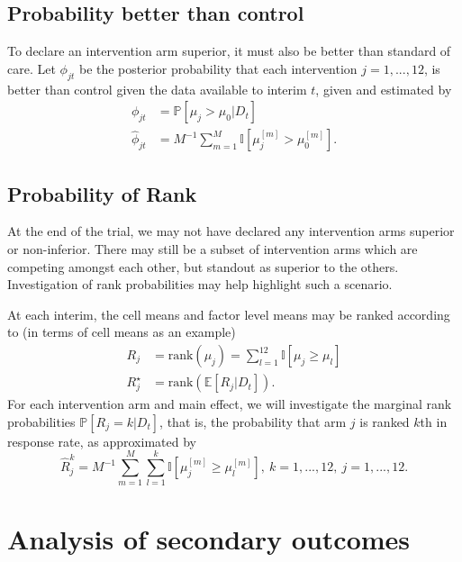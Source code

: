 \documentclass[
  bibliography=totoc]{scrreprt}
\begin{document}
\hypertarget{probability-better-than-control}{%
\subsection{Probability better than control}\label{probability-better-than-control}}

To declare an intervention arm superior, it must also be better than standard of care.
Let \(\phi_{jt}\) be the posterior probability that each intervention \(j=1,...,12\), is better than control given the data available to interim \(t\), given and estimated by
\[
\begin{aligned}
\phi_{jt} &= \mathbb P[\mu_j > \mu_0|D_t] \\
\hat\phi_{jt} &= M^{-1}\sum_{m=1}^M \mathbb I\left[\mu_{j}^{[m]}>\mu_0^{[m]}\right].
\end{aligned}
\]

\hypertarget{probability-of-rank}{%
\subsection{Probability of Rank}\label{probability-of-rank}}

At the end of the trial, we may not have declared any intervention arms superior or non-inferior.
There may still be a subset of intervention arms which are competing amongst each other, but standout as superior to the others.
Investigation of rank probabilities may help highlight such a scenario.

At each interim, the cell means and factor level means may be ranked according to (in terms of cell means as an example)
\[
\begin{aligned}
R_j &= \text{rank}(\mu_j) = \sum_{l=1}^{12} \mathbb I[\mu_j\geq\mu_l] \\
R_j^\star &=\text{rank}\left(\mathbb E[R_j|D_t]\right).
\end{aligned}
\]
For each intervention arm and main effect, we will investigate the marginal rank probabilities \(\mathbb P[R_j=k|D_t]\), that is, the probability that arm \(j\) is ranked \(k\)th in response rate, as approximated by
\[
\hat R_j^k = M^{-1}\sum_{m=1}^M\sum_{l=1}^k \mathbb I\left[\mu_j^{[m]}\geq \mu_l^{[m]}\right],\ k=1,...,12,\ j=1,...,12.
\]

\hypertarget{analysis-of-secondary-outcomes}{%
\section{Analysis of secondary outcomes}\label{analysis-of-secondary-outcomes}}
\end{document}
